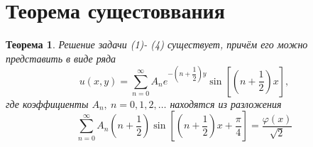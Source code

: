 \documentclass[a4paper, 11pt]{article}
\newtheorem{theorem}{Теорема}
\begin{document}
\section{Теорема сущестоввания}
\begin{theorem}
	Решение задачи (1)- (4) существует, причём его можно представить в виде ряда
	\begin{equation}
		u(x,y) = \sum\limits_{n=0}^{\infty} A_n e^{-\left(n + \dfrac12\right)y} \sin{\left[\left(n + \dfrac12\right)x\right]},
	\end{equation}
	где коэффициенты $A_n, \ n =0,1,2, \dots$ находятся из разложения
	\begin{equation}
		\sum\limits_{n=0}^{\infty} A_n \left(n + \dfrac12 \right) \sin{\left[\left(n +\dfrac12\right)x + \dfrac\pi4\right]} = \dfrac{\varphi(x)}{\sqrt2}
	\end{equation}
\end{theorem}
\end{document}
